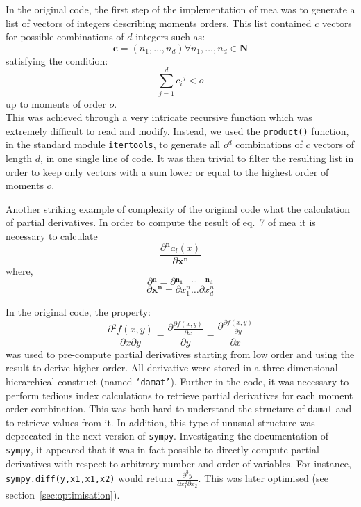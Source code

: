 \documentclass[11pt,a4paper]{article}
\newcommand{\sympy}{\texttt{sympy}}
\begin{document}
In the original code, the first step of the implementation of \acrshort{mea} was to generate a list of vectors of integers describing moments orders.
This list contained $c$ vectors for possible combinations of $d$ integers such as:\\
\[\mathbf{c} =(n_1, \dots, n_d) \forall{n_1, \dots, n_d \in \mathbf{N}}\]
satisfying the condition:\\
\[\sum_{j=1}^{d} {c_i}^j < o\]
up to moments of order $o$.\\

This was achieved through a very intricate recursive function which was extremely difficult to read and modify.
Instead, we used the \texttt{product()} function, in the standard module \texttt{itertools},
to generate all $o^d$ combinations of $c$ vectors of length  $d$, in one single line of code.
It was then trivial to filter the resulting list in order to keep only vectors with a sum lower or equal to the highest order of moments $o$.

Another striking example of complexity of the original code what the calculation of partial derivatives.
In order to compute the result of eq.~7 of \gls{mea}\cite{ale_general_2013} it is necessary to calculate\\
\[\frac{\partial{}^\mathbf{n} a_l(x)}{\partial{}\mathbf{x^n}}\]
where,\\
\[\partial{}^\mathbf{n} = \partial{}^\mathbf{n_1+\dots{}+n_d}\]
\[\partial{} \mathbf{x^n} = \partial{} x^n_1 \dots{} \partial x^n_d\]

In the original code, the property:
\begin{equation}
\label{eq:partial}
\frac{\partial{} ^ 2 f(x,y)}{\partial x \partial y} =
\frac{\partial{} \frac{\partial{} f(x,y)}{\partial x}}{\partial y} =
\frac{\partial{} \frac{\partial{} f(x,y)}{\partial{} y}}{\partial{} x}
\end{equation}
was used to pre-compute partial derivatives starting from low order and using the result to derive higher order.
All derivative were stored in a three dimensional hierarchical construct (named \texttt{`damat'}).
Further in the code, it was necessary to perform  tedious index calculations to
retrieve partial derivatives for each moment order combination.
This was both hard to understand the structure of \texttt{damat} and to retrieve values from it.
In addition, this type of unusual structure was deprecated in the next version of \sympy{}.
Investigating the documentation of \sympy, it appeared that it was in fact possible to directly compute partial derivatives
with respect to arbitrary number and order of variables.
For instance, \texttt{sympy.diff(y,x1,x1,x2)} would return $\frac{\partial^3 y}{\partial x_1^2 \partial x_2}$.
This was later optimised (see section~\ref{sec:optimisation}).
\end{document}
